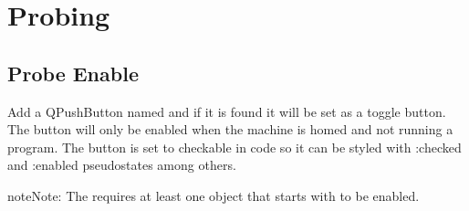 \documentclass[letterpaper,10pt,english]{sphinxmanual}
\begin{document}
\begin{sphinxVerbatim}[commandchars=\\\{\}]
 
         

 
\end{sphinxVerbatim}

\sphinxstepscope


\chapter{Probing}
\label{\detokenize{probe:probing}}\label{\detokenize{probe::doc}}

\section{Probe Enable}
\label{\detokenize{probe:probe-enable}}
\sphinxAtStartPar
Add a QPushButton named  and if it is found it will be set as
a toggle button. The button will only be enabled when the machine is homed and
not running a program. The button is set to checkable in code so it can be
styled with :checked and :enabled pseudo\sphinxhyphen{}states among others.

\begin{sphinxadmonition}{note}{Note:}
\sphinxAtStartPar
The  requires at least one object that starts with
 to be enabled.
\end{sphinxadmonition}

\begin{sphinxVerbatim}[commandchars=\\\{\}]

\end{sphinxVerbatim}
\end{document}
